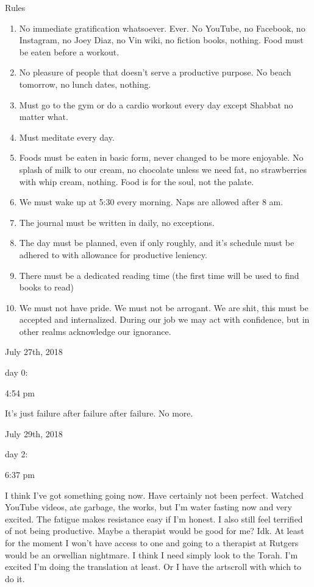 Rules

\begin{enumerate}
\def\labelenumi{\arabic{enumi}.}
\item
  No immediate gratification whatsoever. Ever. No YouTube, no Facebook,
  no Instagram, no Joey Diaz, no Vin wiki, no fiction books, nothing.
  Food must be eaten before a workout.
\item
  No pleasure of people that doesn't serve a productive purpose. No
  beach tomorrow, no lunch dates, nothing.
\item
  Must go to the gym or do a cardio workout every day except Shabbat no
  matter what.
\item
  Must meditate every day.
\item
  Foods must be eaten in basic form, never changed to be more enjoyable.
  No splash of milk to our cream, no chocolate unless we need fat, no
  strawberries with whip cream, nothing. Food is for the soul, not the
  palate.
\item
  We must wake up at 5:30 every morning. Naps are allowed after 8 am.
\item
  The journal must be written in daily, no exceptions.
\item
  The day must be planned, even if only roughly, and it's schedule must
  be adhered to with allowance for productive leniency.
\item
  There must be a dedicated reading time (the first time will be used to
  find books to read)
\item
  We must not have pride. We must not be arrogant. We are shit, this
  must be accepted and internalized. During our job we may act with
  confidence, but in other realms acknowledge our ignorance.
\end{enumerate}

\bigskip
\bigskip
July 27th, 2018

day 0:

4:54 pm

It's just failure after failure after failure. No more.

\bigskip
\bigskip
July 29th, 2018

day 2:

6:37 pm

I think I've got something going now. Have certainly not been perfect.
Watched YouTube videos, ate garbage, the works, but I'm water fasting
now and very excited. The fatigue makes resistance easy if I'm honest. I
also still feel terrified of not being productive. Maybe a therapist
would be good for me? Idk. At least for the moment I won't have access
to one and going to a therapist at Rutgers would be an orwellian
nightmare. I think I need simply look to the Torah. I'm excited I'm
doing the translation at least. Or I have the artscroll with which to do
it.

